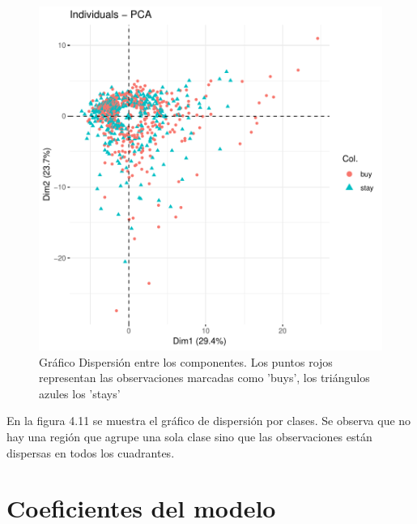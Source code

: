 \documentclass[a4paper,12pt]{Latex/Classes/PhDthesisPSnPDF}
\begin{document}
\begin{figure}[H]
\centering
\includegraphics{main-018}
\caption{Gráfico Dispersión entre los componentes. Los puntos rojos representan las observaciones marcadas como 'buys', los triángulos azules los 'stays'}
\end{figure}

En la figura 4.11 se muestra el gráfico de dispersión por clases. Se observa que no hay una región que agrupe una sola clase sino que las observaciones están dispersas en todos los cuadrantes.



\newpage

\section{Coeficientes del modelo}
\end{document}
